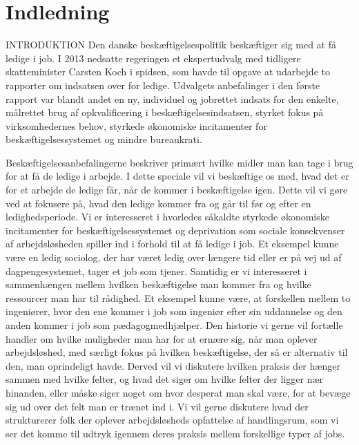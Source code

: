 
\chapter{Indledning} \label{intro}


INTRODUKTION
Den danske beskæftigelsespolitik beskæftiger sig med at få ledige i job. I 2013 nedsatte regeringen et ekspertudvalg med tidligere skatteminister Carsten Koch i spidsen, som havde til opgave at udarbejde to rapporter om indsatsen over for ledige. Udvalgets anbefalinger i den første rapport var blandt andet en ny, individuel og jobrettet indsats for den enkelte, målrettet brug af opkvalificering i beskæftigelsesindsatsen, styrket fokus på virksomhedernes behov, styrkede økonomiske incitamenter for beskæftigelsessystemet og mindre bureaukrati.

Beskæftigelsesanbefalingerne beskriver primært hvilke midler man kan tage i brug for at få de ledige i arbejde. I dette speciale vil vi beskæftige os med, hvad det er for et arbejde de ledige får, når de kommer i beskæftigelse igen. Dette vil vi gøre ved at fokusere på, hvad den ledige kommer fra og går til før og efter en ledighedsperiode. Vi er interesseret i hvorledes såkaldte styrkede økonomiske incitamenter for beskæftigelsessystemet og deprivation som sociale konsekvenser af arbejdsløsheden spiller ind i forhold til at få ledige i job. Et eksempel kunne være en ledig sociolog, der har været ledig over længere tid eller er på vej ud af dagpengesystemet, tager et job som tjener. 
Samtidig er vi interesseret i sammenhængen mellem hvilken beskæftigelse man kommer fra og hvilke ressourcer man har til rådighed. Et eksempel kunne være, at forskellen mellem to ingeniører, hvor den ene kommer i job som ingeniør efter sin uddannelse og den anden kommer i job som pædagogmedhjælper. Den historie vi gerne vil fortælle handler om hvilke muligheder man har for at ernære sig, når man oplever arbejdsløshed, med særligt fokus på hvilken beskæftigelse, der så er alternativ til den, man oprindeligt havde. Derved vil vi diskutere hvilken praksis der hænger sammen med hvilke felter, og hvad det siger om hvilke felter der ligger nær hinanden, eller måske siger noget om hvor desperat man skal være, for at bevæge sig ud over det felt man er trænet ind i. Vi vil gerne diskutere hvad der strukturerer folk der oplever arbejdsløsheds opfattelse af handlingsrum, som vi ser det komme til udtryk igennem deres praksis mellem forskellige typer af jobs.

